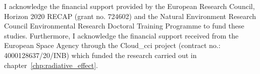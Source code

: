 \begin{funding}

I acknowledge the financial support provided by the European Research Council, Horizon 2020 RECAP (grant no. 724602) and the Natural Environment Research Council Environmental Research Doctoral Training Programme to fund these studies. Furthermore, I acknowledge the financial support received from the European Space Agency through the Cloud\_cci project (contract no.: 4000128637/20/INB) which funded the research carried out in chapter~\ref{chp:radiative_effect}.

\end{funding}